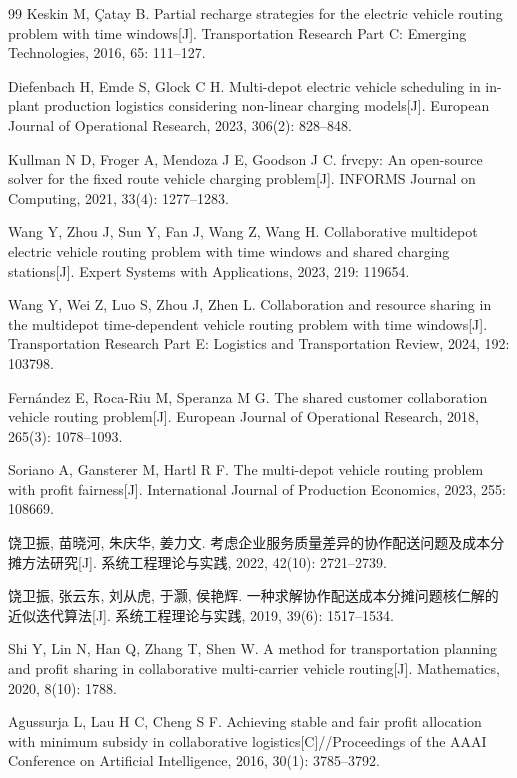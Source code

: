 \documentclass{setp-new}
\begin{document}
\begin{thebibliography}{99}
 Keskin M, \c{C}atay B. Partial recharge strategies for the electric vehicle routing problem with time windows[J]. Transportation Research Part C: Emerging Technologies, 2016, 65: 111--127.

 Diefenbach H, Emde S, Glock C H. Multi-depot electric vehicle scheduling in in-plant production logistics considering non-linear charging models[J]. European Journal of Operational Research, 2023, 306(2): 828--848.

 Kullman N D, Froger A, Mendoza J E, Goodson J C. frvcpy: An open-source solver for the fixed route vehicle charging problem[J]. INFORMS Journal on Computing, 2021, 33(4): 1277--1283.

 Wang Y, Zhou J, Sun Y, Fan J, Wang Z, Wang H. Collaborative multidepot electric vehicle routing problem with time windows and shared charging stations[J]. Expert Systems with Applications, 2023, 219: 119654.

 Wang Y, Wei Z, Luo S, Zhou J, Zhen L. Collaboration and resource sharing in the multidepot time-dependent vehicle routing problem with time windows[J]. Transportation Research Part E: Logistics and Transportation Review, 2024, 192: 103798.

 Fern\'{a}ndez E, Roca-Riu M, Speranza M G. The shared customer collaboration vehicle routing problem[J]. European Journal of Operational Research, 2018, 265(3): 1078--1093.

 Soriano A, Gansterer M, Hartl R F. The multi-depot vehicle routing problem with profit fairness[J]. International Journal of Production Economics, 2023, 255: 108669.

 饶卫振, 苗晓河, 朱庆华, 姜力文. 考虑企业服务质量差异的协作配送问题及成本分摊方法研究[J]. 系统工程理论与实践, 2022, 42(10): 2721--2739.

 饶卫振, 张云东, 刘从虎, 于灏, 侯艳辉. 一种求解协作配送成本分摊问题核仁解的近似迭代算法[J]. 系统工程理论与实践, 2019, 39(6): 1517--1534.

 Shi Y, Lin N, Han Q, Zhang T, Shen W. A method for transportation planning and profit sharing in collaborative multi-carrier vehicle routing[J]. Mathematics, 2020, 8(10): 1788.

 Agussurja L, Lau H C, Cheng S F. Achieving stable and fair profit allocation with minimum subsidy in collaborative logistics[C]//Proceedings of the AAAI Conference on Artificial Intelligence, 2016, 30(1): 3785--3792.


\end{thebibliography}
\end{document}
